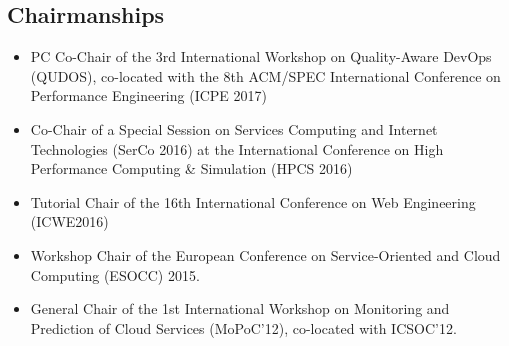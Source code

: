 \documentclass[paper=letter,fontsize=11pt]{scrartcl} %
\begin{document}
\subsection*{Chairmanships}
\begin{itemize}
\item PC Co-Chair of the  3rd International Workshop on Quality-Aware DevOps (QUDOS), co-located with the  8th ACM/SPEC International Conference on Performance Engineering (ICPE 2017)
\item Co-Chair of a Special Session on Services Computing and Internet Technologies (SerCo 2016) at the International Conference on High Performance Computing \& Simulation (HPCS 2016)
\item Tutorial Chair of the 16th International Conference on Web Engineering (ICWE2016)
\item Workshop Chair of the European Conference on Service-Oriented
and Cloud Computing (ESOCC) 2015.
\item General Chair of the 1st International Workshop on Monitoring and
Prediction of Cloud Services (MoPoC'12), co-located with ICSOC'12.
\end{itemize}
\end{document}
